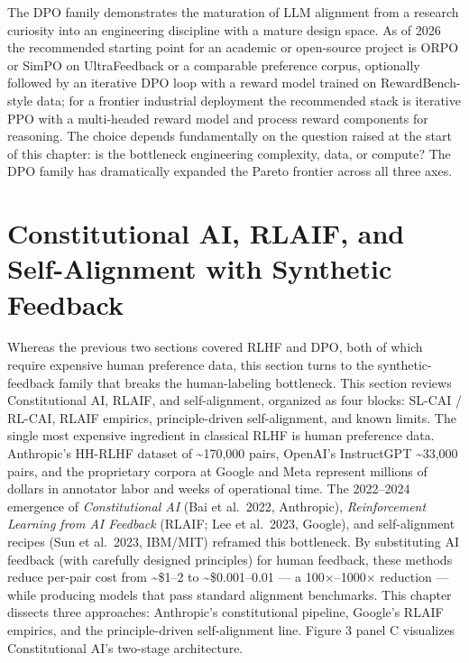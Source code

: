 The DPO family demonstrates the maturation of LLM alignment from a research curiosity into an engineering discipline with a mature design space. As of 2026 the recommended starting point for an academic or open-source project is ORPO or SimPO on UltraFeedback or a comparable preference corpus, optionally followed by an iterative DPO loop with a reward model trained on RewardBench-style data; for a frontier industrial deployment the recommended stack is iterative PPO with a multi-headed reward model and process reward components for reasoning. The choice depends fundamentally on the question raised at the start of this chapter: is the bottleneck engineering complexity, data, or compute? The DPO family has dramatically expanded the Pareto frontier across all three axes.

\section{Constitutional AI, RLAIF, and Self-Alignment with Synthetic Feedback}\label{constitutional-ai-rlaif-and-self-alignment-with-synthetic-feedback}

Whereas the previous two sections covered RLHF and DPO, both of which require expensive human preference data, this section turns to the synthetic-feedback family that breaks the human-labeling bottleneck. This section reviews Constitutional AI, RLAIF, and self-alignment, organized as four blocks: SL-CAI / RL-CAI, RLAIF empirics, principle-driven self-alignment, and known limits. The single most expensive ingredient in classical RLHF is human preference data. Anthropic's HH-RLHF dataset of \textasciitilde170,000 pairs, OpenAI's InstructGPT \textasciitilde33,000 pairs, and the proprietary corpora at Google and Meta represent millions of dollars in annotator labor and weeks of operational time. The 2022--2024 emergence of \emph{Constitutional AI} (Bai et al.~2022, Anthropic), \emph{Reinforcement Learning from AI Feedback} (RLAIF; Lee et al.~2023, Google), and self-alignment recipes (Sun et al.~2023, IBM/MIT) reframed this bottleneck. By substituting AI feedback (with carefully designed principles) for human feedback, these methods reduce per-pair cost from \textasciitilde\$1--2 to \textasciitilde\$0.001--0.01 --- a 100×--1000× reduction --- while producing models that pass standard alignment benchmarks. This chapter dissects three approaches: Anthropic's constitutional pipeline, Google's RLAIF empirics, and the principle-driven self-alignment line. Figure 3 panel C visualizes Constitutional AI's two-stage architecture.

